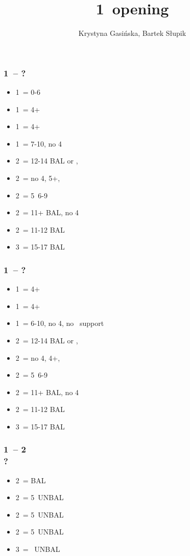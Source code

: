 \documentclass[12pt, a4paper]{article}
\title{1\mins\ opening}
\author{Krystyna Gasińska, Bartek Słupik}
\begin{document}
\maketitle


\subsubsection*{1\clubs\ -- ?}
\begin{itemize}
    \item 1\diams\ = 0-6
    \item 1\hearts\ = 4+\hearts
    \item 1\spades\ = 4+\spades
    \item 1\ntx\ = 7-10, no 4\majs
    \item 2\clubs\ = 12-14 BAL or \clubs, \gf
    \item 2\diams\ = no 4\majs, 5+\diams, \gf
    \item 2\hearts\ = 5\hearts\ 6-9
    \item 2\spades\ = 11+ BAL, no 4\majs
    \item 2\ntx\ = 11-12 BAL
    \item 3\nt\ = 15-17 BAL
\end{itemize}

\subsubsection*{1\diams\ -- ?}
\begin{itemize}
    \item 1\hearts\ = 4+\hearts
    \item 1\spades\ = 4+\spades
    \item 1\ntx\ = 6-10, no 4\majs, no \diams\ support
    \item 2\clubs\ = 12-14 BAL or \clubs, \gf
    \item 2\diams\ = no 4\majs, 4+\diams, \gf
    \item 2\hearts\ = 5\hearts\ 6-9
    \item 2\spades\ = 11+ BAL, no 4\majs
    \item 2\ntx\ = 11-12 BAL
    \item 3\nt\ = 15-17 BAL
\end{itemize}

\subsubsection*{1\clubs\ -- 2\clubs \\ ?}
\begin{itemize}
    \item 2\diams\ = BAL
    \item 2\hearts\ = 5\hearts\ UNBAL
    \item 2\spades\ = 5\spades\ UNBAL
    \item 2\nt\ = 5\diams\ UNBAL
    \item 3\clubs\ = \clubs\ UNBAL
\end{itemize}
\end{document}
